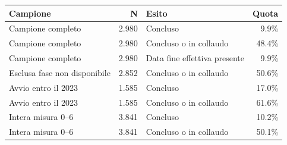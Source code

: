 \begin{tabular}{lrlr}
\toprule
Campione & N & Esito & Quota \\
\midrule
Campione completo & 2.980 & Concluso & 9.9\% \\
Campione completo & 2.980 & Concluso o in collaudo & 48.4\% \\
Campione completo & 2.980 & Data fine effettiva presente & 9.9\% \\
Esclusa fase non disponibile & 2.852 & Concluso o in collaudo & 50.6\% \\
Avvio entro il 2023 & 1.585 & Concluso & 17.0\% \\
Avvio entro il 2023 & 1.585 & Concluso o in collaudo & 61.6\% \\
Intera misura 0--6 & 3.841 & Concluso & 10.2\% \\
Intera misura 0--6 & 3.841 & Concluso o in collaudo & 50.1\% \\
\bottomrule
\end{tabular}
